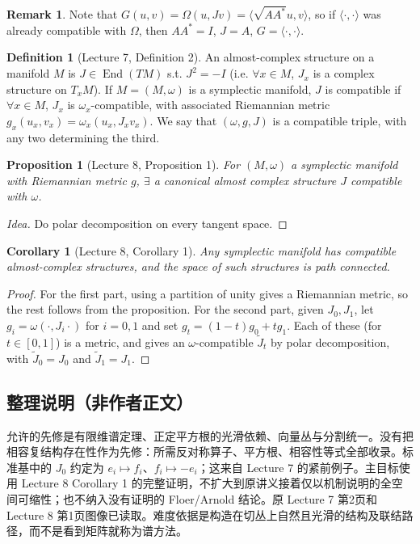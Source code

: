 \documentclass[UTF8,11pt]{ctexart}
\newtheorem*{proposition}{Proposition}
\newtheorem*{corollary}{Corollary}
\theoremstyle{definition}
\newtheorem*{definition}{Definition}
\newtheorem*{remark}{Remark}
\DeclareMathOperator{\End}{End}
\begin{document}
\begin{remark}
Note that $G(u,v)=\Omega(u,Jv)=\langle\sqrt{AA^*}u,v\rangle$, so if $\langle\cdot,\cdot\rangle$ was already compatible with $\Omega$, then $AA^*=I$, $J=A$, $G=\langle\cdot,\cdot\rangle$.
\end{remark}
\begin{definition}[Lecture 7, Definition 2]
An almost-complex structure on a manifold $M$ is $J\in\End(TM)$ s.t. $J^2=-I$ (i.e. $\forall x\in M$, $J_x$ is a complex structure on $T_xM$). If $M=(M,\omega)$ is a symplectic manifold, $J$ is compatible if $\forall x\in M$, $J_x$ is $\omega_x$-compatible, with associated Riemannian metric $g_x(u_x,v_x)=\omega_x(u_x,J_xv_x)$. We say that $(\omega,g,J)$ is a compatible triple, with any two determining the third.
\end{definition}
\begin{proposition}[Lecture 8, Proposition 1]
For $(M,\omega)$ a symplectic manifold with Riemannian metric $g$, $\exists$ a canonical almost complex structure $J$ compatible with $\omega$.
\end{proposition}
\begin{proof}[Idea]
Do polar decomposition on every tangent space.
\end{proof}
\begin{corollary}[Lecture 8, Corollary 1]
Any symplectic manifold has compatible almost-complex structures, and the space of such structures is path connected.
\end{corollary}
\begin{proof}
For the first part, using a partition of unity gives a Riemannian metric, so the rest follows from the proposition. For the second part, given $J_0,J_1$, let $g_i=\omega(\cdot,J_i\cdot)$ for $i=0,1$ and set $g_t=(1-t)g_0+tg_1$. Each of these (for $t\in[0,1]$) is a metric, and gives an $\omega$-compatible $\widetilde J_t$ by polar decomposition, with $\widetilde J_0=J_0$ and $\widetilde J_1=J_1$.
\end{proof}

\subsection*{整理说明（非作者正文）}
允许的先修是有限维谱定理、正定平方根的光滑依赖、向量丛与分割统一。没有把相容复结构存在性作为先修：所需反对称算子、平方根、相容性等式全部收录。标准基中的 $J_0$ 约定为 $e_i\mapsto f_i$、$f_i\mapsto-e_i$；这来自 Lecture 7 的紧前例子。主目标使用 Lecture 8 Corollary 1 的完整证明，不扩大到原讲义接着仅以机制说明的全空间可缩性；也不纳入没有证明的 Floer/Arnold 结论。原 Lecture 7 第2页和 Lecture 8 第1页图像已读取。难度依据是构造在切丛上自然且光滑的结构及联结路径，而不是看到矩阵就称为谱方法。
\end{document}
